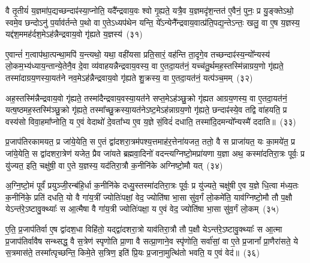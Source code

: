 वै तृ॒तीयं॑ य॒ज्ञमा॑प॒द्यच्छन्दाꣴ॑स्या॒प्नोति॒ यदै᳚न्द्रवाय॒वः श्वो गृ॒ह्यते॒ यत्रै॒व य॒ज्ञमदृ॑श॒न्तत॑ ए॒वैनं॒ पुनः॒ प्र यु॒ङ्क्ते\-ऽथो॒ स्वमे॒व छन्दो\-ऽनु॑ प॒र्याव॑र्तन्ते प॒थो वा ए॒ते\-ऽध्यप॑थेन यन्ति॒ ये᳚\-ऽन्येनै᳚न्द्रवाय॒वात्प्र॑ति॒पद्य॒न्ते\-ऽन्तः॒ खलु॒ वा ए॒ष य॒ज्ञस्य॒ यद्द॑श॒ममह॑र्दश॒मे\-ऽह॑न्नैन्द्रवाय॒वो गृ॑ह्यते य॒ज्ञस्य॑~(३१)

ए॒वान्तं॑ ग॒त्वाप॑था॒त्पन्था॒मपि॑ य॒न्त्यथो॒ यथा॒ वही॑यसा प्रति॒सारं॒ वह॑न्ति ता॒दृगे॒व तच्छन्दाꣴ॑स्य॒न्यो᳚न्यस्य॑ लो॒कम॒भ्य॑ध्याय॒न्तान्ये॒तेनै॒व दे॒वा व्य॑वाहयन्नैन्द्रवाय॒वस्य॒ वा ए॒तदा॒यत॑नं॒ यच्च॑तु॒र्थमह॒स्तस्मि॑न्नाग्रय॒णो गृ॑ह्यते॒ तस्मा॑दाग्रय॒णस्या॒यत॑ने नव॒मे\-ऽह॑न्नैन्द्रवाय॒वो गृ॑ह्यते शु॒क्रस्य॒ वा ए॒तदा॒यत॑नं॒ यत्प॑ञ्च॒मम्~(३२)

अह॒स्तस्मि॑न्नैन्द्रवाय॒वो गृ॑ह्यते॒ तस्मा॑दैन्द्रवाय॒वस्या॒यत॑ने सप्त॒मे\-ऽह॑ञ्छु॒क्रो गृ॑ह्यत आग्रय॒णस्य॒ वा ए॒तदा॒यत॑नं॒ यत्ष॒ष्ठमह॒स्तस्मि॑ञ्छु॒क्रो गृ॑ह्यते॒ तस्मा᳚च्छु॒क्रस्या॒यत॑ने\-ऽष्ट॒मे\-ऽह॑न्नाग्रय॒णो गृ॑ह्यते॒ छन्दाꣴ॑स्ये॒व तद्वि वा॑हयति॒ प्र वस्य॑सो विवा॒हमा᳚प्नोति॒ य ए॒वं वेदाथो॑ दे॒वता᳚भ्य ए॒व य॒ज्ञे सं॒विदं॑ दधाति॒ तस्मा॑दि॒दमन्यो᳚न्यस्मै॑ ददाति॥~(३३)

{\anuvakamend[{ए॒तद्वै प॑ञ्च॒मे\-ऽह॒न्त्रैष्टु॑भ ए॒तद्गृ॑ह्यते य॒ज्ञस्य॑ प़ञ्च॒मम॒न्यस्मा॒ एक॑ञ्च}]}%

प्र॒जा\-प॑तिरकामयत॒ प्र जा॑ये॒येति॒ स ए॒तं द्वा॑दशरा॒त्रम॑पश्य॒त्तमाह॑र॒त्तेना॑यजत॒ ततो॒ वै स प्राजा॑यत॒ यः का॒मये॑त॒ प्र जा॑ये॒येति॒ स द्वा॑दशरा॒त्रेण॑ यजेत॒ प्रैव जा॑यते ब्रह्मवा॒दिनो॑ वदन्त्यग्निष्टो॒मप्रा॑यणा य॒ज्ञा अथ॒ कस्मा॑दतिरा॒त्रः पूर्वः॒ प्र यु॑ज्यत॒ इति॒ चक्षु॑षी॒ वा ए॒ते य॒ज्ञस्य॒ यद॑तिरा॒त्रौ क॒नीनि॑के अग्निष्टो॒मौ यत्~(३४)

अ॒ग्नि॒ष्टो॒मं पूर्वं॑ प्रयुञ्जी॒रन्ब॑हि॒र्धा क॒नीनि॑के दध्यु॒स्तस्मा॑दतिरा॒त्रः पूर्वः॒ प्र यु॑ज्यते॒ चक्षु॑षी ए॒व य॒ज्ञे धि॒त्वा म॑ध्य॒तः क॒नीनि॑के॒ प्रति॑ दधति॒ यो वै गा॑य॒त्रीं ज्योतिः॑पक्षां॒ वेद॒ ज्योति॑षा भा॒सा सु॑व॒र्गं लो॒कमे॑ति॒ याव॑ग्निष्टो॒मौ तौ प॒क्षौ ये\-ऽन्त॑रे॒\-ऽष्टावु॒क्थ्याः᳚ स आ॒त्मैषा वै गा॑य॒त्री ज्योतिः॑पक्षा॒ य ए॒वं वेद॒ ज्योति॑षा भा॒सा सु॑व॒र्गं लो॒कम्~(३५)

ए॒ति॒ प्र॒जा\-प॑तिर्वा ए॒ष द्वा॑दश॒धा विहि॑तो॒ यद्द्वा॑दशरा॒त्रो याव॑तिरा॒त्रौ तौ प॒क्षौ ये\-ऽन्त॑रे॒\-ऽष्टावु॒क्थ्याः᳚ स आ॒त्मा प्र॒जा\-प॑तिर्वावैष सन्थ्सद्ध॒ वै स॒त्रेण॑ स्पृणोति प्रा॒णा वै सत्प्रा॒णाने॒व स्पृ॑णोति॒ सर्वा॑सां॒ वा ए॒ते प्र॒जानां᳚ प्रा॒णैरा॑सते॒ ये स॒त्रमास॑ते॒ तस्मा᳚त्पृच्छन्ति॒ किमे॒ते स॒त्रिण॒ इति॑ प्रि॒यः प्र॒जाना॒मुत्थि॑तो भवति॒ य ए॒वं वेद॑॥~(३६)

{\anuvakamend[{अ॒ग्नि॒ष्टो॒मौ यथ्सु॑व॒र्गं लो॒कं प्रि॒यः प्र॒जानां॒ पञ्च॑ च}]}%

